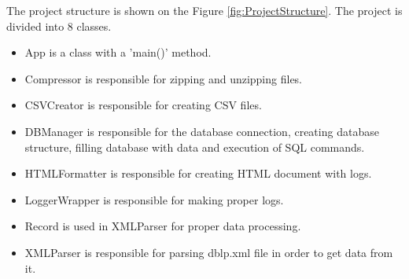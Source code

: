 \documentclass{acm_proc_article-sp}
\begin{document}
The project structure is shown on the Figure \ref{fig:ProjectStructure}. The project is divided into 8 classes.
\begin{itemize}
	\item App is a class with a 'main()' method.
	\item Compressor is responsible for zipping and unzipping files.
	\item CSVCreator is responsible for creating CSV files.
	\item DBManager is responsible for the database connection, creating database structure, filling database with data and execution of SQL commands.
	\item HTMLFormatter is responsible for creating HTML document with logs.
	\item LoggerWrapper is responsible for making proper logs.
	\item Record is used in XMLParser for proper data processing.
	\item XMLParser is responsible for parsing dblp.xml file in order to get data from it.
\end{itemize}
\end{document}

